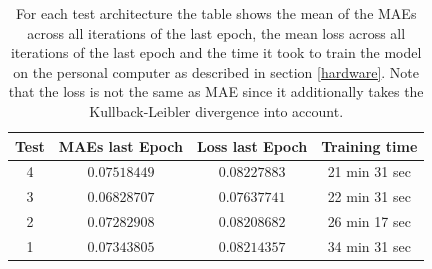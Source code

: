 \begin{center}
    \begin{table}[H]
        \centering
        \begin{tabular}{ | c | c | c | c | }
            \hline
            Test &MAEs last Epoch & Loss last Epoch & Training time\\ \hline
            4 & $0.07518449$  & $0.08227883$  & 21 min 31 sec  \\
            3 & $0.06828707$  & $0.07637741$  & 22 min 31 sec  \\
            2 & $0.07282908$  & $0.08208682$  & 26 min 17 sec  \\  
            1 & $0.07343805$  & $0.08214357$  & 34 min 31 sec  \\  
            \hline
        \end{tabular} 
        \caption{For each test architecture the table shows the mean of the MAEs across all iterations of the last
        epoch, the mean loss across all iterations of the last epoch and the time it took to train the model
        on the personal computer as described in section \ref{hardware}. Note that the loss is not the same
        as MAE since it additionally takes the Kullback-Leibler divergence into account.}
    \end{table} \label{table_maes2}
\end{center}

